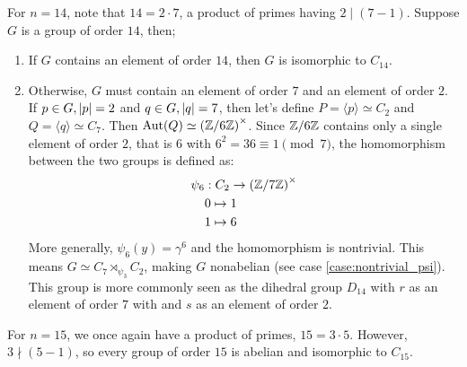 For $n = 14$, note that $14 = 2 \cdot 7$, a product of primes having $2 \mid (7 - 1)$.
Suppose $G$ is a group of order $14$, then;
\begin{enumerate}
  \item If $G$ contains an element of order $14$, then $G$ is isomorphic to $C_{14}$.
  \item Otherwise, $G$ must contain an element of order $7$ and an element of order $2$.
    If $p \in G, \lvert p\rvert = 2$ and $q \in G, \lvert q\rvert = 7$,
    then let's define $P = \langle p \rangle \simeq C_2$ and $Q = \langle q \rangle \simeq C_7$.
    Then $\operatorname{Aut}(Q) \simeq {(\mathbb{Z}/6\mathbb{Z})}^\times$.
    Since $\mathbb{Z}/6\mathbb{Z}$ contains only a single element of order $2$,
    that is $6$ with $6^2 = 36 \equiv 1 \pmod 7$,
    the homomorphism between the two groups is defined as:
    \begin{align*}
      \psi_6 &: C_2 \to {(\mathbb{Z}/7\mathbb{Z})}^\times \\
           & 0 \mapsto 1 \\
           & 1 \mapsto 6 \\
    \end{align*}
    More generally, $\psi_6 (y) = \gamma^6$ and the homomorphism is nontrivial.
    This means $G \simeq C_7 \rtimes_{\psi_3} C_2$, making $G$ nonabelian
    (see case \ref{case:nontrivial_psi}).
    This group is more commonly seen as the dihedral group $D_{14}$
    with $r$ as an element of order $7$ with
    and $s$ as an element of order $2$.
\end{enumerate}

For $n = 15$, we once again have a product of primes, $15 = 3 \cdot 5$.
However, $3 \nmid (5 - 1)$, so every group of order $15$
is abelian and isomorphic to $C_{15}$.
